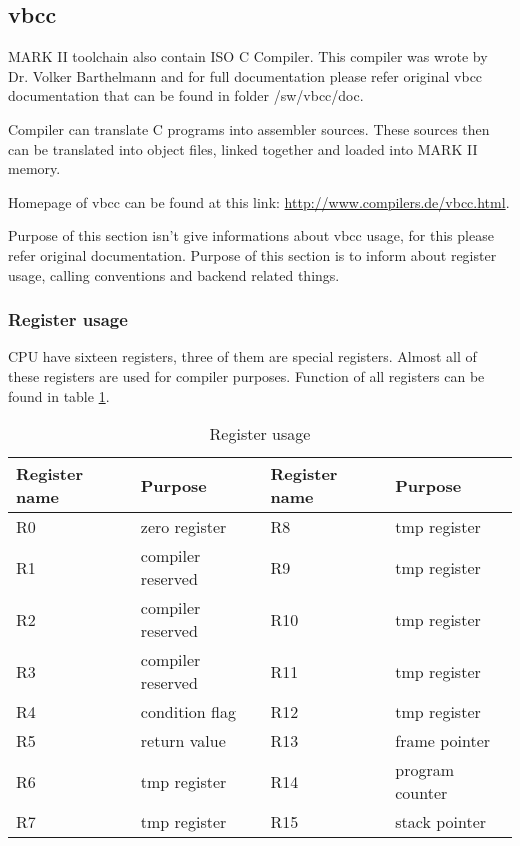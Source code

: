\subsection{vbcc}

MARK II toolchain also contain ISO C Compiler. This compiler was wrote by
Dr. Volker Barthelmann and for full documentation please refer original vbcc
documentation that can be found in folder /sw/vbcc/doc.

Compiler can translate C programs into assembler sources. These sources then can
be translated into object files, linked together and loaded into MARK II memory.

Homepage of vbcc can be found at this link: \url{http://www.compilers.de/vbcc.html}.

Purpose of this section isn't give informations about vbcc usage, for this please
refer original documentation. Purpose of this section is to inform about register
usage, calling conventions and backend related things.

\subsubsection{Register usage}

CPU have sixteen registers, three of them are special registers. Almost all
of these registers are used for compiler purposes. Function of all registers
can be found in table \ref{tab:registers_list_ussage}.

\begin{table}[h]
    \centering
    \begin{tabular}{|l|l|l|l|}
        \hline
        \textbf{Register name} & \textbf{Purpose}  & \textbf{Register name} & \textbf{Purpose} \\ \hline
        R0                     & zero register     & R8                     & tmp register     \\ \hline
        R1                     & compiler reserved & R9                     & tmp register     \\ \hline
        R2                     & compiler reserved & R10                    & tmp register     \\ \hline
        R3                     & compiler reserved & R11                    & tmp register     \\ \hline
        R4                     & condition flag    & R12                    & tmp register     \\ \hline
        R5                     & return value      & R13                    & frame pointer    \\ \hline
        R6                     & tmp register      & R14                    & program counter  \\ \hline
        R7                     & tmp register      & R15                    & stack pointer    \\ \hline
    \end{tabular}
    \caption{Register usage}
    \label{tab:registers_list_ussage}
\end{table}


